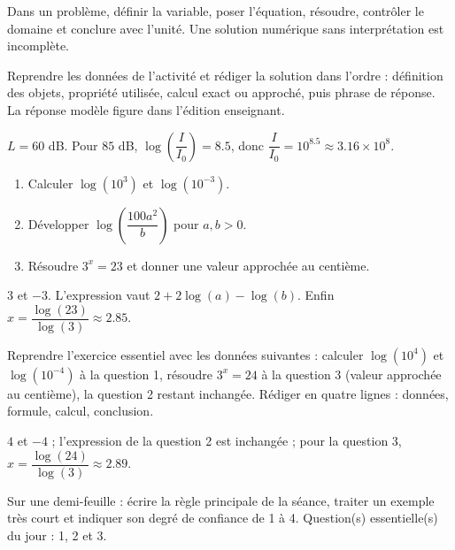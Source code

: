 \begin{summary}Dans un problème, définir la variable, poser l'équation, résoudre, contrôler le domaine et conclure avec l'unité. Une solution numérique sans interprétation est incomplète.\end{summary}

\begin{example}
Reprendre les données de l'activité et rédiger la solution dans l'ordre : définition des objets, propriété utilisée, calcul exact ou approché, puis phrase de réponse. La réponse modèle figure dans l'édition enseignant.
\end{example}
\begin{solution}$L=60$ dB. Pour $85$ dB, $\log\!\left(\dfrac I{I_0}\right)=\num{8,5}$, donc $\dfrac I{I_0}=10^{\num{8,5}}\approx\num{3,16}\times10^8$.\end{solution}

\begin{exercise}[essentiel]
\begin{enumerate}\item Calculer $\log(10^3)$ et $\log(10^{-3})$.\item Développer $\log\!\left(\dfrac{100a^2}{b}\right)$ pour $a,b>0$.\item Résoudre $3^x=23$ et donner une valeur approchée au centième.\end{enumerate}
\end{exercise}
\begin{solution}$3$ et $-3$. L'expression vaut $2+2\log(a)-\log(b)$. Enfin $x=\dfrac{\log(23)}{\log(3)}\approx\num{2,85}$.\end{solution}


\begin{homework}Reprendre l'exercice essentiel avec les données suivantes : calculer $\log(10^{4})$ et $\log(10^{-4})$ à la question 1, résoudre $3^x=24$ à la question 3 (valeur approchée au centième), la question 2 restant inchangée. Rédiger en quatre lignes : données, formule, calcul, conclusion.\end{homework}
\begin{solution}$4$ et $-4$ ; l'expression de la question 2 est inchangée ; pour la question 3, $x=\dfrac{\log(24)}{\log(3)}\approx\num{2,89}$.\end{solution}

\begin{exitticket}[3 minutes]Sur une demi-feuille : écrire la règle principale de la séance, traiter un exemple très court et indiquer son degré de confiance de 1 à 4. Question(s) essentielle(s) du jour : 1, 2 et 3.\end{exitticket}

